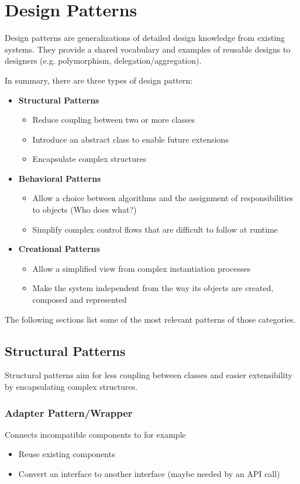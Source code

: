 
\section{Design Patterns}
Design patterns are generalizations of detailed design knowledge from existing systems.
They provide a shared vocabulary and examples of reusable designs to designers (e.g. polymorphism, delegation/aggregation).

In summary, there are three types of design pattern:
\begin{itemize}
	\item \textbf{Structural Patterns}
		\begin{itemize}
			\item Reduce coupling between two or more classes
			\item Introduce an abstract class to enable future extensions
			\item Encapsulate complex structures
		\end{itemize}
	\item \textbf{Behavioral Patterns}
		\begin{itemize}
			\item Allow a choice between algorithms and the assignment of responsibilities to objects (\glqq Who does what?\grqq)
			\item Simplify complex control flows that are difficult to follow at runtime
		\end{itemize}
	\item \textbf{Creational Patterns}
		\begin{itemize}
			\item Allow a simplified view from complex instantiation processes
			\item Make the system independent from the way its objects are created,
			composed and represented
		\end{itemize}
\end{itemize}

The following sections list some of the most relevant patterns of those categories.

\newpage
\subsection{Structural Patterns}
Structural patterns aim for less coupling between classes and easier extensibility by encapsulating complex structures.

\subsubsection{Adapter Pattern/Wrapper}
Connects incompatible components to for example
\begin{itemize}
  \item Reuse existing components
  \item Convert an interface to another interface (maybe needed by an API call)
\end{itemize}

